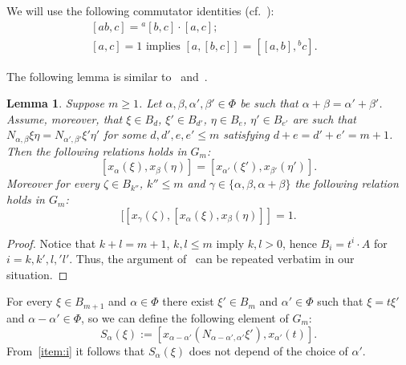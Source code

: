 \documentclass[oneside, 10pt]{amsart}
\numberwithin{equation}{section}
\newtheorem{lemma}{Lemma}
\numberwithin{lemma}{section}
\theoremstyle{definition}
\theoremstyle{remark}
\begin{document}
We will use the following commutator identities (cf.~\cite[H1]{Re75}):
\begin{align}
 \label{eq:H1ii}  [ab, c] = {}^a[b, c] \cdot [a,c];&\\ %
 \label{eq:H1iii} [a,c]   = 1    \text{ implies } [a, [b,c]] = [[a,b],{}^bc].&
\end{align}

The following lemma is similar to~\cite[Proposition 1.1]{Re75} and~\cite[Proposition~3.2.2]{RS76}.
\begin{lemma}
 Suppose $m \geq 1$.
 Let $\alpha, \beta, \alpha', \beta' \in \Phi$ be such that $\alpha + \beta = \alpha' + \beta'$.
 Assume, moreover, that $\xi \in B_d$, $\xi' \in B_{d'}$, $\eta \in B_e$, $\eta' \in B_{e'}$ are such that 
  $N_{\alpha, \beta} \xi \eta = N_{\alpha', \beta'}\xi' \eta'$ for some $d,d',e,e'\leq m$ satisfying $d+e=d'+e' = m+1$.
 Then the following relations holds in $G_m$:
 \begin{equation}
  \label{item:i} [x_\alpha(\xi), x_\beta(\eta)] = [x_{\alpha'}(\xi'), x_{\beta'}(\eta')].
 \end{equation}
 Moreover for every $\zeta \in B_{k''}$, $k''\leq m$ and $\gamma\in\{\alpha, \beta, \alpha + \beta\}$
  the following relation holds in $G_m$:
 \begin{equation}
 \label{item:ii} [[x_\gamma(\zeta), [x_\alpha(\xi), x_\beta(\eta)]] = 1.
 \end{equation}
\end{lemma}
\begin{proof}
 Notice that $k+l = m+1$, $k, l\leq m$ imply $k,l>0$, hence $B_i= t^i \cdot A$ for $i=k,k',l,'l'$.
 Thus, the argument of~\cite[Proposition 1.1]{Re75} can be repeated verbatim in our situation.
\end{proof}

For every $\xi \in B_{m+1}$ and $\alpha\in \Phi$ there exist $\xi' \in B_m$ and $\alpha'\in \Phi$ such that $\xi = t\xi'$ and $\alpha-\alpha'\in\Phi$,
so we can define the following element of $G_m$:
\begin{equation} \label{eq:defmpn} S_\alpha(\xi) := [x_{\alpha-\alpha'}(N_{\alpha-\alpha',\alpha'} \xi'), x_{\alpha'}(t)].\end{equation} 
From~\eqref{item:i} it follows that $S_\alpha(\xi)$ does not depend of the choice of $\alpha'$.
\end{document}
